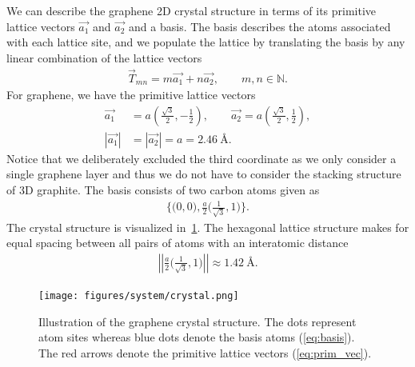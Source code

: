 \begin{multicols}{2}
We can describe the graphene 2D crystal structure in terms of its primitive lattice vectors $\vec{a_1}$ and $\vec{a_2}$ and a basis. The basis describes the atoms associated with each lattice site, and we populate the lattice by translating the basis by any linear combination of the lattice vectors 
\begin{align*}
  \vec{T}_{mn} = m\vec{a_1} + n\vec{a_2}, \qquad m,n \in \mathbb{N}.
\end{align*}
For graphene, we have the primitive lattice vectors~\cite{gray2009crystal} 
\begin{align}
  \vec{a_1} &= a \left(\frac{\sqrt{3}}{2}, -\frac{1}{2}\right), \qquad \vec{a_2} = a \left(\frac{\sqrt{3}}{2}, \frac{1}{2}\right), \label{eq:prim_vec} \\
  |\vec{a_1}| &= |\vec{a_2}| = a = 2.46 \ \text{Å}. \nonumber
\end{align}
Notice that we deliberately excluded the third coordinate as we only consider a
single graphene layer and thus we do not have to consider the stacking structure of 3D graphite. The basis consists of two carbon atoms given as 
\begin{align}
  \Big\{\Big(0,0\Big), \frac{a}{2}\Big(\frac{1}{\sqrt{3}}, 1 \Big) \Big\}.
  \label{eq:basis}
\end{align}
The crystal structure is visualized in~\cref{fig:graphene_crystal}. The hexagonal lattice structure makes for equal spacing between all pairs of atoms with an interatomic distance
\begin{align*}
  \left|\left|\frac{a}{2}\Big(\frac{1}{\sqrt{3}}, 1 \Big)\right|\right| \approx 1.42 \ \text{Å}.
\end{align*}
  
\begin{figure}[H]
  \centering
  \texttt{[image: figures/system/crystal.png]}
  \caption{Illustration of the graphene crystal structure. The dots represent atom sites whereas blue dots denote the basis atoms (\cref{eq:basis}). The red arrows denote the primitive lattice vectors (\cref{eq:prim_vec}). }
  \label{fig:graphene_crystal}
\end{figure}
  
\end{multicols}



